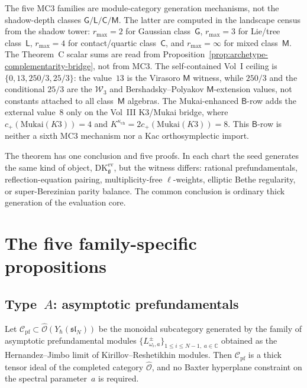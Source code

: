 \begin{remark}
\label{rem:mc3-vs-shadow-archetypes}
%
The five MC3 families are module-category generation mechanisms, not
the shadow-depth classes $\mathsf G/\mathsf L/\mathsf C/\mathsf M$.
The latter are computed in the landscape census from the shadow tower:
$r_{\max}=2$ for Gaussian class~$\mathsf G$, $r_{\max}=3$ for
Lie/tree class~$\mathsf L$, $r_{\max}=4$ for contact/quartic
class~$\mathsf C$, and $r_{\max}=\infty$ for mixed class~$\mathsf M$.
The Theorem~C scalar sums are read from
Proposition~\ref{prop:archetype-complementarity-bridge}, not from
MC3.  The self-contained Vol~I ceiling is
$\{0,13,250/3,25/3\}$: the value~$13$ is the Virasoro
$\mathsf M$ witness, while $250/3$ and the conditional $25/3$ are the
$\mathcal W_3$ and Bershadsky--Polyakov $\mathsf M$-extension
values, not constants attached to all class~$\mathsf M$ algebras.
The Mukai-enhanced $\mathsf B$-row adds the external value~$8$ only
on the Vol~III K3/Mukai bridge, where
$c_+(\mathrm{Mukai}(K3))=4$ and
$K^{\kappa_{\mathrm{ch}}}=2c_+(\mathrm{Mukai}(K3))=8$.  This
$\mathsf B$-row is neither a sixth MC3 mechanism nor a Kac
orthosymplectic import.
\end{remark}

\begin{remark}
\label{rem:mc3-assembly-point}
The theorem has one conclusion and five proofs. In each chart the
seed generates the same kind of object,
$\mathrm{DK}^{\mathrm{ev}}_\mathfrak{g}$, but the witness differs:
rational prefundamentals, reflection-equation pairing,
multiplicity-free $\ell$-weights, elliptic Bethe regularity, or
super-Berezinian parity balance. The common conclusion is ordinary
thick generation of the evaluation core.
\end{remark}

\section{The five family-specific propositions}
\label{sec:mc3-five-family-propositions}

\subsection{Type~$A$: asymptotic prefundamentals}

\begin{proposition}
\label{prop:mc3-type-A-asymptotic-prefundamentals-platonic}
%
%
%
Let $\mathcal{C}_{\mathrm{pf}} \subset
\widehat{\mathcal{O}}(Y_\hbar(\mathfrak{sl}_N))$ be the monoidal
subcategory generated by the family of asymptotic prefundamental
modules $\{L^\pm_{\omega_i,a}\}_{1 \le i \le N-1,\; a \in \mathbb{C}}$
obtained as the Hernandez--Jimbo limit of Kirillov--Reshetikhin
modules. Then $\mathcal{C}_{\mathrm{pf}}$ is a thick tensor ideal of
the completed category $\widehat{\mathcal{O}}$, and no Baxter
hyperplane constraint on the spectral parameter~$a$ is required.
\end{proposition}

